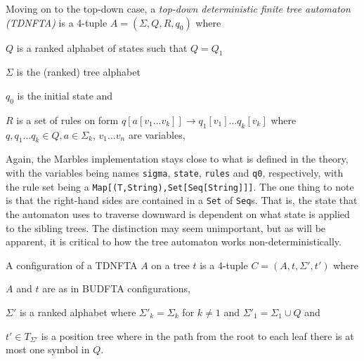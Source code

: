 Moving on to the top-down case, a \emph{top-down deterministic finite tree
automaton (TDNFTA)} is a 4-tuple $A = (\Sigma, Q, R, q_0)$ where
\begin{compactitem}
\item $Q$ is a ranked alphabet of states such that $Q = Q_1$
\item $\Sigma$ is the (ranked) tree alphabet
\item $q_0$ is the initial state and 
\item $R$ is a set of rules on form
$q[a[v_1 \ldots v_k]] \rightarrow q_1[v_1] \ldots  q_k[v_k]$
where $q, q_1 \ldots q_k \in Q, a \in \Sigma_k$, $v_1 \ldots v_n$
are variables,
\end{compactitem}
\vspace{0.5cm}

Again, the Marbles implementation stays close to what is defined in the
theory, with the variables being names \texttt{sigma}, \texttt{state},
\texttt{rules} and \texttt{q0}, respectively, with the rule set being a
\texttt{Map[(T,String),Set[Seq[String]]]}. The one thing to note is that
the right-hand sides are contained in a \texttt{Set} of \texttt{Seq}s. That
is, the state that the automaton uses to traverse downward is dependent on
what state is applied to the sibling trees. The distinction may seem
unimportant, but as will be apparent, it is critical to how the tree
automaton works non-deterministically.

A configuration of a TDNFTA $A$ on a tree $t$ is a 4-tuple $C = (A, t, \Sigma', t')$
where 
\begin{compactitem}
\item $A$ and $t$ are as in BUDFTA configurations,
\item $\Sigma'$ is a ranked alphabet where $\Sigma'_k = \Sigma_k$ for $k \neq 1$ and
$\Sigma'_1 = \Sigma_1 \cup Q$ and
\item $t' \in T_{\Sigma'}$ is a position tree where in the path from the
root to each leaf there is at most one symbol in $Q$.
\end{compactitem}
\vspace{0.5cm}

